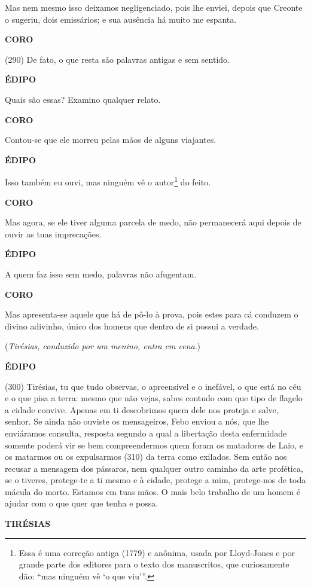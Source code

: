 Mas nem mesmo isso deixamos negligenciado, pois lhe enviei, depois que
Creonte o sugeriu, dois emissários; e sua ausência há muito me espanta.

\textbf{CORO}

(290) De fato, o que resta são palavras antigas e sem sentido.

\textbf{ÉDIPO}

Quais são essas? Examino qualquer relato.

\textbf{CORO}

Contou-se que ele morreu pelas mãos de alguns viajantes.

\textbf{ÉDIPO}

Isso também eu ouvi, mas ninguém vê o autor\footnote{Essa é uma correção
  antiga (1779) e anônima, usada por Lloyd-Jones e por grande parte dos
  editores para o texto dos manuscritos, que curiosamente dão: ``mas
  ninguém vê `o que viu'''.} do feito.

\textbf{CORO}

Mas agora, se ele tiver alguma parcela de medo, não permanecerá aqui
depois de ouvir as tuas imprecações.

\textbf{ÉDIPO}

A quem faz isso sem medo, palavras não afugentam.

\textbf{CORO}

Mas apresenta-se aquele que há de pô-lo à prova, pois estes para cá
conduzem o divino adivinho, único dos homens que dentro de si possui a
verdade.

(\emph{Tirésias, conduzido por um menino, entra em cena}.)

\textbf{ÉDIPO}

(300) Tirésias, tu que tudo observas, o apreensível e o inefável, o que
está no céu e o que pisa a terra: mesmo que não vejas, sabes contudo com
que tipo de flagelo a cidade convive. Apenas em ti descobrimos quem dele
nos proteja e salve, senhor. Se ainda não ouviste os mensageiros, Febo
enviou a nós, que lhe enviáramos consulta, resposta segundo a qual a
libertação desta enfermidade somente poderá vir se bem compreendermos
quem foram os matadores de Laio, e os matarmos ou os expulsarmos (310)
da terra como exilados. Sem então nos recusar a mensagem dos pássaros,
nem qualquer outro caminho da arte profética, se o tiveres, protege-te a
ti mesmo e à cidade, protege a mim, protege-nos de toda mácula do morto.
Estamos em tuas mãos. O mais belo trabalho de um homem é ajudar com o
que quer que tenha e possa.

\textbf{TIRÉSIAS}


